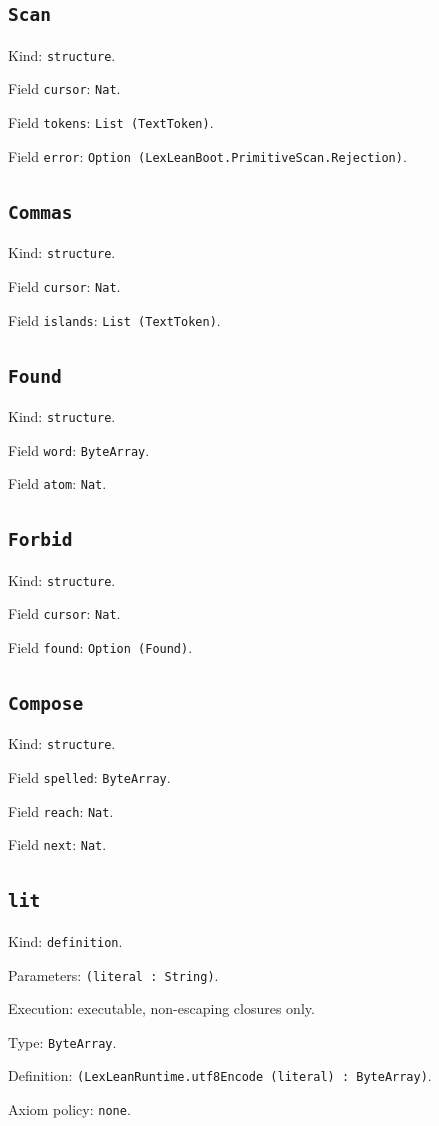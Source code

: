 \documentclass[11pt]{article}
\begin{document}
\subsection*{\texttt{Scan}}
\noindent Kind: \texttt{structure}.\par
\noindent Field \texttt{cursor}: \texttt{Nat}.\par
\noindent Field \texttt{tokens}: \texttt{List (TextToken)}.\par
\noindent Field \texttt{error}: \texttt{Option (LexLeanBoot.PrimitiveScan.Rejection)}.\par
\subsection*{\texttt{Commas}}
\noindent Kind: \texttt{structure}.\par
\noindent Field \texttt{cursor}: \texttt{Nat}.\par
\noindent Field \texttt{islands}: \texttt{List (TextToken)}.\par
\subsection*{\texttt{Found}}
\noindent Kind: \texttt{structure}.\par
\noindent Field \texttt{word}: \texttt{ByteArray}.\par
\noindent Field \texttt{atom}: \texttt{Nat}.\par
\subsection*{\texttt{Forbid}}
\noindent Kind: \texttt{structure}.\par
\noindent Field \texttt{cursor}: \texttt{Nat}.\par
\noindent Field \texttt{found}: \texttt{Option (Found)}.\par
\subsection*{\texttt{Compose}}
\noindent Kind: \texttt{structure}.\par
\noindent Field \texttt{spelled}: \texttt{ByteArray}.\par
\noindent Field \texttt{reach}: \texttt{Nat}.\par
\noindent Field \texttt{next}: \texttt{Nat}.\par
\subsection*{\texttt{lit}}
\noindent Kind: \texttt{definition}.\par
\noindent Parameters: \texttt{(literal : String)}.\par
\noindent Execution: executable, non-escaping closures only.\par
\noindent Type: \texttt{ByteArray}.\par
\noindent Definition: \texttt{(LexLeanRuntime.utf8Encode (literal) : ByteArray)}.\par
\noindent Axiom policy: \texttt{none}.\par
\end{document}
